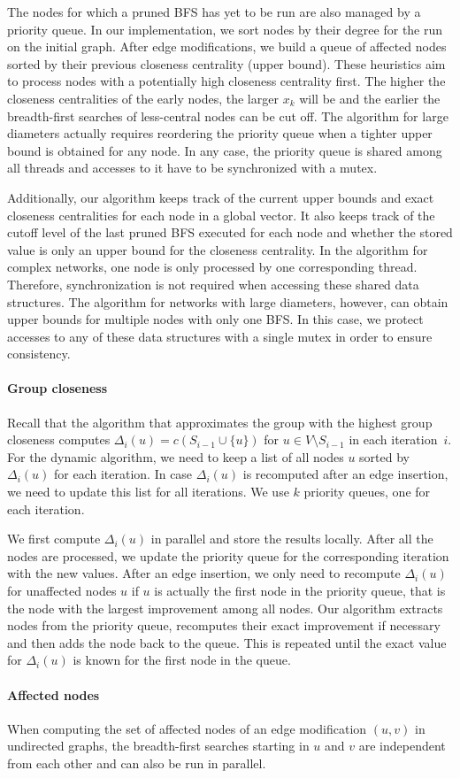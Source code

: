 The nodes for which a pruned BFS has yet to be run are also managed by a priority queue. In our implementation, we sort nodes by their degree for the run on the initial graph. After edge modifications, we build a queue of affected nodes sorted by their previous closeness centrality (upper bound). These heuristics aim to process nodes with a potentially high closeness centrality first. The higher the closeness centralities of the early nodes, the larger $x_k$ will be and the earlier the breadth-first searches of less-central nodes can be cut off. The algorithm for large diameters actually requires reordering the priority queue when a tighter upper bound is obtained for any node. In any case, the priority queue is shared among all threads and accesses to it have to be synchronized with a mutex.

Additionally, our algorithm keeps track of the current upper bounds and exact closeness centralities for each node in a global vector. It also keeps track of the cutoff level of the last pruned BFS executed for each node and whether the stored value is only an upper bound for the closeness centrality. In the algorithm for complex networks, one node is only processed by one corresponding thread. Therefore, synchronization is not required when accessing these shared data structures. The algorithm for networks with large diameters, however, can obtain upper bounds for multiple nodes with only one BFS. In this case, we protect accesses to any of these data structures with a single mutex in order to ensure consistency.

\paragraph{Group closeness}
Recall that the algorithm that approximates the group with the highest group closeness computes $\Delta_i(u) = c(S_{i - 1} \cup \{u\})$ for $u \in V \setminus S_{i - 1}$ in each iteration~$i$. For the dynamic algorithm, we need to keep a list of all nodes $u$ sorted by $\Delta_i(u)$ for each iteration. In case $\Delta_i(u)$ is recomputed after an edge insertion, we need to update this list for all iterations. We use $k$ priority queues, one for each iteration.

We first compute $\Delta_i(u)$ in parallel and store the results locally. After all the nodes are processed, we update the priority queue for the corresponding iteration with the new values. After an edge insertion, we only need to recompute $\Delta_i(u)$ for unaffected nodes $u$ if $u$ is actually the first node in the priority queue, that is the node with the largest improvement among all nodes. Our algorithm extracts nodes from the priority queue, recomputes their exact improvement if necessary and then adds the node back to the queue. This is repeated until the exact value for $\Delta_i(u)$ is known for the first node in the queue.

\paragraph{Affected nodes}
When computing the set of affected nodes of an edge modification $(u, v)$ in undirected graphs, the breadth-first searches starting in $u$ and $v$ are independent from each other and can also be run in parallel.

